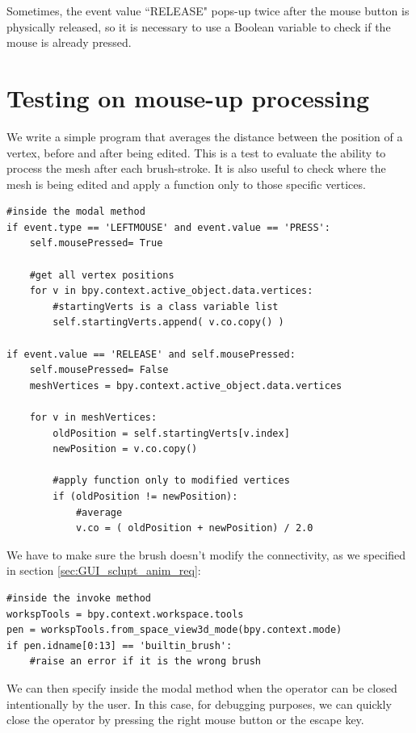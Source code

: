 \documentclass[12pt,twoside]{report}
\begin{document}
Sometimes, the event value ``RELEASE" pops-up twice after the mouse button is physically released, so it is necessary to use a Boolean variable to check if the mouse is already pressed.

\section{Testing on mouse-up processing}
\label{sec:on-mouse-up}
We write a simple program that averages the distance between the position of a vertex, before and after being edited. This is a test to evaluate the ability to process the mesh after each brush-stroke. It is also useful to check where the mesh is being edited and apply a function only to those specific vertices.

\begin{lstlisting}
#inside the modal method
if event.type == 'LEFTMOUSE' and event.value == 'PRESS':
    self.mousePressed= True
    
    #get all vertex positions
    for v in bpy.context.active_object.data.vertices:
        #startingVerts is a class variable list 
        self.startingVerts.append( v.co.copy() )

if event.value == 'RELEASE' and self.mousePressed:
    self.mousePressed= False
    meshVertices = bpy.context.active_object.data.vertices
    
    for v in meshVertices:
        oldPosition = self.startingVerts[v.index]
        newPosition = v.co.copy()
        
        #apply function only to modified vertices
        if (oldPosition != newPosition):
            #average
            v.co = ( oldPosition + newPosition) / 2.0
\end{lstlisting}

We have to make sure the brush doesn't modify the connectivity, as we specified in section \ref{sec:GUI_sclupt_anim_req}:

\begin{lstlisting}
#inside the invoke method
workspTools = bpy.context.workspace.tools
pen = workspTools.from_space_view3d_mode(bpy.context.mode)
if pen.idname[0:13] == 'builtin_brush':
    #raise an error if it is the wrong brush
\end{lstlisting}

We can then specify inside the modal method when the operator can be closed intentionally by the user. In this case, for debugging purposes, we can quickly close the operator by pressing the right mouse button or the escape key.
\end{document}
